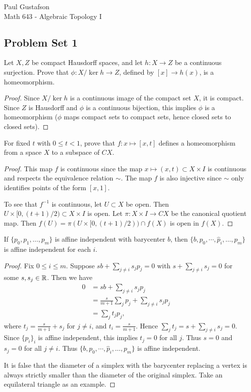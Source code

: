 \documentclass{article}
\begin{document}
\noindent Paul Gustafson\\
\noindent Math 643 - Algebraic Topology I


\subsection*{Problem Set 1}
 Let $X,Z$ be compact Hausdorff spaces, and let $h:X \to Z$ be a continuous
surjection. Prove that $\phi: X /\ker h \to Z$, defined by $[x] \to h(x)$, is a homeomorphism.
\begin{proof}
Since $X/\ker h$ is a continuous image of the compact set $X$, it is compact. Since $Z$
is Hausdorff and $\phi$ is a continuous bijection, this implies $\phi$ is a homeomorphism
($\phi$ maps compact sets to compact sets, hence closed sets to closed sets).
\end{proof}

 For fixed $t$ with $0 \le t < 1$, prove that $f: x \mapsto [x,t]$ defines a homeomorphism
from a space $X$ to a subspace of $CX$.
\begin{proof}
This map $f$ is continuous since the map $x \mapsto (x,t) \subset X \times I$ is continuous and
respects the equivalence relation $\sim$.  The map $f$ is also injective since $\sim$ only identifies
points of the form $[x,1]$.  

To see that $f^{-1}$ is continuous, let $U \subset X$ be open. Then $U \times [0, (t+1)/2) \subset X \times I$
is open.  Let $\pi: X \times I \to CX$ be the canonical quotient map.
Then $f(U) = \pi(U \times [0, (t+1)/2)) \cap f(X)$ is open in $f(X)$.
\end{proof}

 If $\{p_0, p_1, \ldots, p_m\}$ is affine independent with barycenter $b$, then $\{b, p_0, \cdots, 
\hat p_i, \ldots, p_m \}$ is affine independent for each $i$.
\begin{proof}
Fix $0 \le i \le m$.  Suppose $sb + \sum_{j \neq i} s_j p_j = 0$ with $s + \sum_{j \neq i} s_j = 0$ for some $s,s_j \in \mathbb{R}$.
Then we have
\begin{align*}
0 & = sb + \sum_{j \neq i} s_j p_j \\
& = \frac{s}{m+1} \sum_j p_j + \sum_{j \neq i} s_j p_j \\
& = \sum_j t_j p_j,
\end{align*}
where $t_j = \frac{s}{m+1} + s_j$ for $j \neq i$, and $t_i = \frac{s}{m+1}$.
Hence $\sum_j t_j = s + \sum_{j \neq i} s_j = 0$.  Since $\{p_i\}_i$ is affine independent,
this implies $t_j = 0$ for all $j$.  Thus $s = 0$ and $s_j = 0$ for all $j \neq i$.
Thus $\{b, p_0, \cdots, \hat p_i, \ldots, p_m \}$ is affine independent.

It is false that the diameter of a simplex with the barycenter replacing a vertex is
always strictly smaller than the diameter of the original simplex. 
Take an equilateral triangle as an example.
\end{proof}
\end{document}
